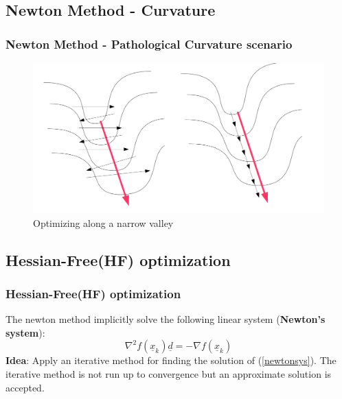 \documentclass[professionalfont]{beamer}
\begin{document}
  \subsection{Newton Method - Curvature}
  \begin{frame}
	\frametitle{Newton Method - Pathological Curvature scenario}
  \begin{figure}
    \centering
    \includegraphics[scale=0.4]{curvature.png}
    \caption{Optimizing along a narrow valley}
    \label{}
  \end{figure}
  \end{frame}

  \subsection{Hessian-Free(HF) optimization}
	\begin{frame}
	  \frametitle{Hessian-Free(HF) optimization}
     The newton method implicitly solve the following linear system (\textbf{Newton's system}):
    \begin{equation}
      \nabla^{2} f(\underline{x}_k) \underline{d} = - \nabla f(\underline{x}_k)
      \label{newtonsys}
    \end{equation}
    \textbf{Idea}: Apply an iterative method for finding the solution of (\ref{newtonsys}).\newline\newline
    The iterative method is not run up to convergence but an approximate solution is accepted.

	\end{frame}
\end{document}
